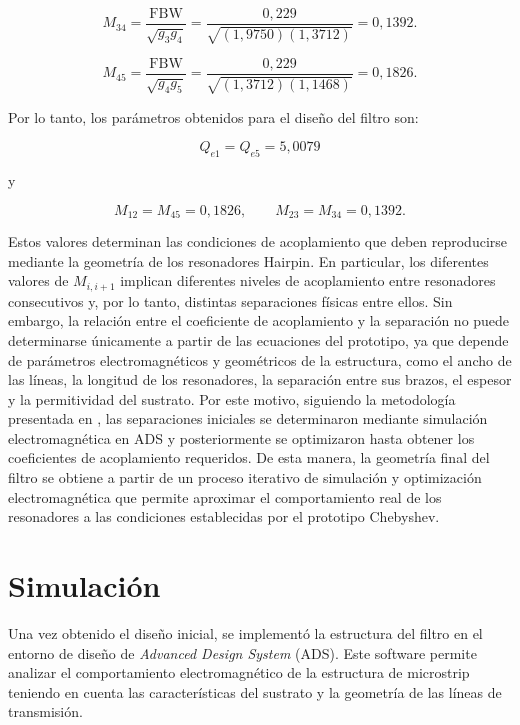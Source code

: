 \begin{equation}
    M_{34} = \frac{\mathrm{FBW}}{\sqrt{g_3 g_4}} = \frac{0{,}229}{\sqrt{(1{,}9750)(1{,}3712)}} = 0{,}1392.
\end{equation}

\begin{equation}
    M_{45} = \frac{\mathrm{FBW}}{\sqrt{g_4 g_5}} = \frac{0{,}229}{\sqrt{(1{,}3712)(1{,}1468)}} = 0{,}1826.
\end{equation}

Por lo tanto, los parámetros obtenidos para el diseño del filtro son:

\begin{equation}
Q_{e1} = Q_{e5} = 5{,}0079
\end{equation}

y

\begin{equation}
M_{12} = M_{45} = 0{,}1826, \qquad M_{23} = M_{34} = 0{,}1392.
\end{equation}

Estos valores determinan las condiciones de acoplamiento que deben reproducirse mediante la geometría de los resonadores Hairpin. En particular, los diferentes valores de $M_{i,i+1}$ implican diferentes niveles de acoplamiento entre resonadores consecutivos y, por lo tanto, distintas separaciones físicas entre ellos. Sin embargo, la relación entre el coeficiente de acoplamiento y la separación no puede determinarse únicamente a partir de las ecuaciones del prototipo, ya que depende de parámetros electromagnéticos y geométricos de la estructura, como el ancho de las líneas, la longitud de los resonadores, la separación entre sus brazos, el espesor y la permitividad del sustrato. Por este motivo, siguiendo la metodología presentada en \cite{A Hasan}, las separaciones iniciales se determinaron mediante simulación electromagnética en ADS y posteriormente se optimizaron hasta obtener los coeficientes de acoplamiento requeridos. De esta manera, la geometría final del filtro se obtiene a partir de un proceso iterativo de simulación y optimización electromagnética que permite aproximar el comportamiento real de los resonadores a las condiciones establecidas por el prototipo Chebyshev.

\section{Simulación}

Una vez obtenido el diseño inicial, se implementó la estructura del filtro en el entorno de diseño de \textit{Advanced Design System} (ADS). Este software permite analizar el comportamiento electromagnético de la estructura de microstrip teniendo en cuenta las características del sustrato y la geometría de las líneas de transmisión.

